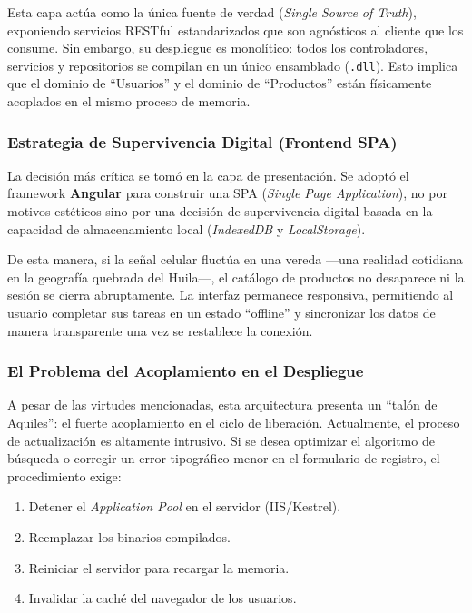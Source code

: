 Esta capa actúa como la única fuente de verdad (\textit{Single Source of Truth}), exponiendo servicios RESTful estandarizados que son agnósticos al cliente que los consume. Sin embargo, su despliegue es monolítico: todos los controladores, servicios y repositorios se compilan en un único ensamblado (\texttt{.dll}). Esto implica que el dominio de ``Usuarios'' y el dominio de ``Productos'' están físicamente acoplados en el mismo proceso de memoria.

\subsubsection{Estrategia de Supervivencia Digital (Frontend SPA)}

La decisión más crítica se tomó en la capa de presentación. Se adoptó el framework \textbf{Angular} para construir una SPA (\textit{Single Page Application}), no por motivos estéticos sino por una decisión de supervivencia digital basada en la capacidad de almacenamiento local (\textit{IndexedDB} y \textit{LocalStorage}).

De esta manera, si la señal celular fluctúa en una vereda —una realidad cotidiana en la geografía quebrada del Huila—, el catálogo de productos no desaparece ni la sesión se cierra abruptamente. La interfaz permanece responsiva, permitiendo al usuario completar sus tareas en un estado ``offline'' y sincronizar los datos de manera transparente una vez se restablece la conexión.

\subsubsection{El Problema del Acoplamiento en el Despliegue}

A pesar de las virtudes mencionadas, esta arquitectura presenta un ``talón de Aquiles'': el fuerte acoplamiento en el ciclo de liberación. Actualmente, el proceso de actualización es altamente intrusivo. Si se desea optimizar el algoritmo de búsqueda o corregir un error tipográfico menor en el formulario de registro, el procedimiento exige:

\begin{enumerate}
    \item Detener el \textit{Application Pool} en el servidor (IIS/Kestrel).
    \item Reemplazar los binarios compilados.
    \item Reiniciar el servidor para recargar la memoria.
    \item Invalidar la caché del navegador de los usuarios.
\end{enumerate}

